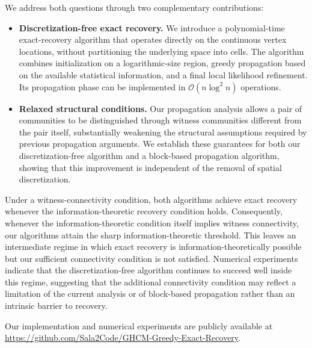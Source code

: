 \documentclass[11pt, a4paper]{amsart}
\newcommand{\1}{\mathbf{1}}
\theoremstyle{definition}
\theoremstyle{remark}
\theoremstyle{definition}
\begin{document}
We address both questions through two complementary contributions:
\begin{itemize}
    \item \textbf{Discretization-free exact recovery.}
    We introduce a polynomial-time exact-recovery algorithm that operates
    directly on the continuous vertex locations, without partitioning the
    underlying space into cells. The algorithm combines initialization on a
    logarithmic-size region, greedy propagation based on the available
    statistical information, and a final local likelihood refinement. Its
    propagation phase can be implemented in
    $\mathcal O(n\log^2 n)$ operations.

\item \textbf{Relaxed structural conditions.}
Our propagation analysis allows a pair of communities to be
distinguished through witness communities different from the pair
itself, substantially weakening the structural assumptions required by
previous propagation arguments. We establish these guarantees for both
our discretization-free algorithm and a block-based propagation
algorithm, showing that this improvement is independent of the removal
of spatial discretization.
\end{itemize}

Under a witness-connectivity condition, both algorithms achieve exact
recovery whenever the information-theoretic recovery condition holds.
Consequently, whenever the information-theoretic condition itself implies
witness connectivity, our algorithms attain the sharp information-theoretic
threshold. This leaves an intermediate regime in which exact recovery is
information-theoretically possible but our sufficient connectivity condition
is not satisfied. Numerical experiments indicate that the
discretization-free algorithm continues to succeed well inside this regime,
suggesting that the additional connectivity condition may reflect a
limitation of the current analysis or of block-based propagation rather than
an intrinsic barrier to recovery.

Our implementation and numerical experiments are publicly available at
\url{https://github.com/Sala2Code/GHCM-Greedy-Exact-Recovery}.
\end{document}
